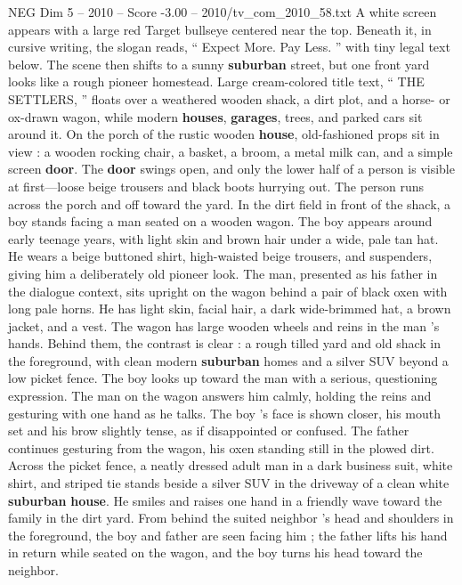 \begin{textsample}{NEG Dim 5 – 2010 – Score -3.00 – 2010/tv\_com\_2010\_58.txt}  \label{ex:f5_neg_057}
A white screen appears with a large red Target bullseye centered near the top.
Beneath it, in cursive writing, the slogan reads, “ Expect More.
Pay Less. ” with tiny legal text below.
The scene then shifts to a sunny \textbf{suburban} street, but one front yard looks like a rough pioneer homestead.
Large cream-colored title text, “ THE SETTLERS, ” floats over a weathered wooden shack, a dirt plot, and a horse- or ox-drawn wagon, while modern \textbf{houses}, \textbf{garages}, trees, and parked cars sit around it.
On the porch of the rustic wooden \textbf{house}, old-fashioned props sit in view : a wooden rocking chair, a basket, a broom, a metal milk can, and a simple screen \textbf{door}.
The \textbf{door} swings open, and only the lower half of a person is visible at first—loose beige trousers and black boots hurrying out.
The person runs across the porch and off toward the yard.
In the dirt field in front of the shack, a boy stands facing a man seated on a wooden wagon.
The boy appears around early teenage years, with light skin and brown hair under a wide, pale tan hat.
He wears a beige buttoned shirt, high-waisted beige trousers, and suspenders, giving him a deliberately old pioneer look.
The man, presented as his father in the dialogue context, sits upright on the wagon behind a pair of black oxen with long pale horns.
He has light skin, facial hair, a dark wide-brimmed hat, a brown jacket, and a vest.
The wagon has large wooden wheels and reins in the man ’s hands.
Behind them, the contrast is clear : a rough tilled yard and old shack in the foreground, with clean modern \textbf{suburban} homes and a silver SUV beyond a low picket fence.
The boy looks up toward the man with a serious, questioning expression.
The man on the wagon answers him calmly, holding the reins and gesturing with one hand as he talks.
The boy ’s face is shown closer, his mouth set and his brow slightly tense, as if disappointed or confused.
The father continues gesturing from the wagon, his oxen standing still in the plowed dirt.
Across the picket fence, a neatly dressed adult man in a dark business suit, white shirt, and striped tie stands beside a silver SUV in the driveway of a clean white \textbf{suburban} \textbf{house}.
He smiles and raises one hand in a friendly wave toward the family in the dirt yard.
From behind the suited neighbor ’s head and shoulders in the foreground, the boy and father are seen facing him ; the father lifts his hand in return while seated on the wagon, and the boy turns his head toward the neighbor.

\end{textsample}
